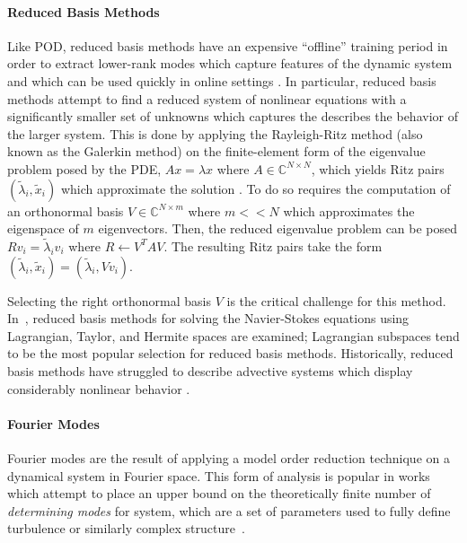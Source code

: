 \paragraph{Reduced Basis Methods} Like POD, reduced basis methods have an expensive ``offline'' training period in order to extract lower-rank modes which capture features of the dynamic system and which can be used quickly in online settings \autocite{ohlberger2015reduced}. In particular, reduced basis methods attempt to find a reduced system of nonlinear equations with a significantly smaller set of unknowns which captures the describes the behavior of the larger system. This is done by applying the Rayleigh-Ritz method (also known as the Galerkin method) on the finite-element form of the eigenvalue problem posed by the PDE, $Ax = \lambda x$ where $A\in\mathbb{C}^{N\times N}$, which yields Ritz pairs $(\tilde{\lambda}_i, \tilde{x}_i)$ which approximate the solution \autocite{noor1980reduced}. To do so requires the computation of an orthonormal basis $V \in \mathbb{C}^{N\times m}$ where $m << N$ which approximates the eigenspace of $m$ eigenvectors.
Then, the reduced eigenvalue problem can be posed $Rv_i = \tilde{\lambda}_iv_i$ where $R \longleftarrow V^TAV$. The resulting Ritz pairs take the form $(\tilde{\lambda}_i, \tilde{x}_i) = (\tilde{\lambda}_i, Vv_i)$.

Selecting the right orthonormal basis $V$ is the critical challenge for this method. In~\cite{quarteroni2007numerical}, reduced basis methods for solving the Navier-Stokes equations using Lagrangian, Taylor, and Hermite spaces are examined; Lagrangian subspaces tend to be the most popular selection for reduced basis methods. Historically, reduced basis methods have struggled to describe advective systems which display considerably nonlinear behavior \autocite{quarteroni2007numerical,ohlberger2015reduced}.

\paragraph{Fourier Modes} Fourier modes are the result of applying a model order reduction technique on a dynamical system in Fourier space. This form of analysis is popular in works which attempt to place an upper bound on the theoretically finite number of \emph{determining modes} for system, which are a set of parameters used to fully define turbulence or similarly complex structure~\autocite{jones1993upper}.

